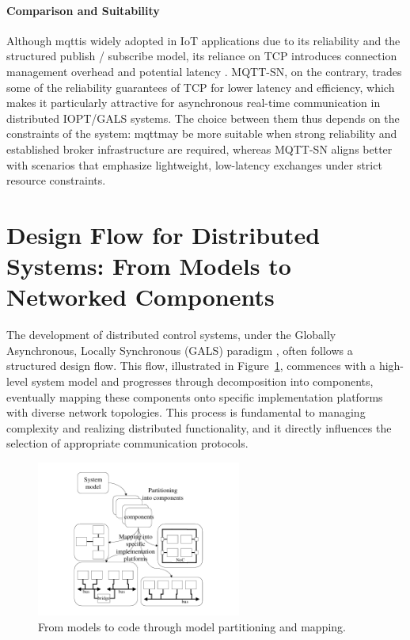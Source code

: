 \paragraph{Comparison and Suitability}
Although \gls{mqtt}is widely adopted in IoT applications due to its reliability and the structured publish / subscribe model, its reliance on TCP introduces connection management overhead and potential latency \cite{banks2014mqtt}. MQTT-SN, on the contrary, trades some of the reliability guarantees of TCP for lower latency and efficiency, which makes it particularly attractive for asynchronous real-time communication in distributed IOPT/GALS systems. The choice between them thus depends on the constraints of the system: \gls{mqtt}may be more suitable when strong reliability and established broker infrastructure are required, whereas MQTT-SN aligns better with scenarios that emphasize lightweight, low-latency exchanges under strict resource constraints.



 

\section{Design Flow for Distributed Systems: From Models to Networked Components }
\label{sec:design_flow}

The development of distributed control systems, under the Globally Asynchronous, Locally Synchronous (GALS) paradigm \cite{galsactd, galsborman}, often follows a structured design flow. This flow, illustrated in Figure~\ref{fig:model_to_code_mapping}, commences with a high-level system model and progresses through decomposition into components, eventually mapping these components onto specific implementation platforms with diverse network topologies. This process is fundamental to managing complexity and realizing distributed functionality, and it directly influences the selection of appropriate communication protocols.


\begin{figure}[htbp]
  \centering
 \includegraphics[width=0.6\textwidth]{Chapters/Figures/model_to_code_mapping.png}
  \caption{From models to code through model partitioning and mapping.}
  \label{fig:model_to_code_mapping}
\end{figure}

